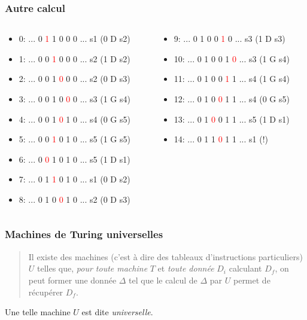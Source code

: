 \begin{frame}
  \frametitle{Autre calcul}
\begin{columns}
  \begin{column}{6cm}
    \begin{itemize}
     \item 0: ... 0 \textcolor{red}{1} 1 0 0 0 ... s1 (0 D s2)
     \item 1: ... 0 0 \textcolor{red}{1} 0 0 0 ... s2 (1 D s2)
     \item 2: ... 0 0 1 \textcolor{red}{0} 0 0 ... s2 (0 D s3)
     \item 3: ... 0 0 1 0 \textcolor{red}{0} 0 ... s3 (1 G s4)
     \item 4: ... 0 0 1 \textcolor{red}{0} 1 0 ... s4 (0 G s5)
     \item 5: ... 0 0 \textcolor{red}{1} 0 1 0 ... s5 (1 G s5)
     \item 6: ... 0 \textcolor{red}{0} 1 0 1 0 ... s5 (1 D s1)
     \item 7: ... 0 1 \textcolor{red}{1} 0 1 0 ... s1 (0 D s2)
     \item 8: ... 0 1 0 \textcolor{red}{0} 1 0 ... s2 (0 D s3)
    \end{itemize}
  \end{column}

  \begin{column}{6.5cm}
  \begin{itemize}
    \item 9: ... 0 1 0 0 \textcolor{red}{1} 0 ... s3 (1 D s3)
    \item 10: ... 0 1 0 0 1 \textcolor{red}{0} ... s3 (1 G s4)
    \item 11: ... 0 1 0 0 \textcolor{red}{1} 1 ... s4 (1 G s4)
    \item 12: ... 0 1 0 \textcolor{red}{0} 1 1 ... s4 (0 G s5)
    \item 13: ... 0 1 \textcolor{red}{0} 0 1 1 ... s5 (1 D s1)
    \item 14: ... 0 1 1 \textcolor{red}{0} 1 1 ... s1 (!)
  \end{itemize}
  \end{column}
\end{columns}
\end{frame}

\begin{frame}
  \frametitle{Machines de Turing universelles}
\begin{quotation}
  Il existe des machines (c'est à dire des tableaux d'instructions particuliers) $U$ telles que, \emph{pour toute machine} $T$ et \emph{toute donnée} $D_i$ calculant $D_f$, on peut former une donnée $\Delta$ tel que le calcul de $\Delta$ par $U$ permet de récupérer $D_f$.
\end{quotation} 
Une telle machine $U$ est dite \emph{universelle}.
\end{frame}

